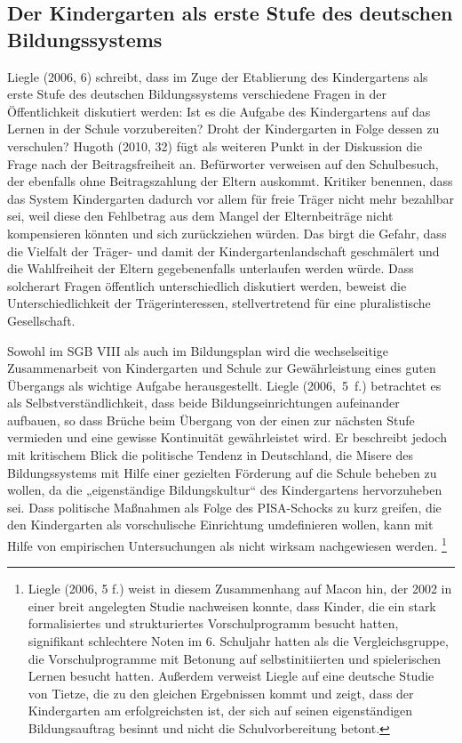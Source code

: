 \subsection{Der Kindergarten als erste Stufe des deutschen Bildungssystems}
Liegle (2006, 6) schreibt, dass im Zuge der Etablierung des Kindergartens als erste Stufe des deutschen Bildungssystems verschiedene Fragen in der Öffentlichkeit diskutiert werden: Ist es die Aufgabe des Kindergartens auf das Lernen in der Schule vorzubereiten? Droht der Kindergarten in Folge dessen zu verschulen? Hugoth (2010, 32) fügt als weiteren Punkt in der Diskussion die Frage nach der Beitragsfreiheit an. Befürworter verweisen auf den Schulbesuch, der ebenfalls ohne Beitragszahlung der Eltern auskommt. Kritiker benennen, dass das System Kindergarten dadurch vor allem für freie Träger nicht mehr bezahlbar sei, weil diese den Fehlbetrag aus dem Mangel der Elternbeiträge nicht kompensieren könnten und sich zurückziehen würden. Das birgt die Gefahr, dass die Vielfalt der Träger- und damit der Kindergartenlandschaft geschmälert und die Wahlfreiheit der Eltern gegebenenfalls unterlaufen werden würde. Dass solcherart Fragen öffentlich unterschiedlich diskutiert werden, beweist die Unterschiedlichkeit der Trägerinteressen, stellvertretend für eine pluralistische Gesellschaft. 

Sowohl im SGB VIII als auch im Bildungsplan wird die wechselseitige Zusammenarbeit von Kindergarten und Schule zur Gewährleistung eines guten Übergangs als wichtige Aufgabe herausgestellt. Liegle (2006,~5~f.) betrachtet es als Selbstverständlichkeit, dass beide Bildungseinrichtungen aufeinander aufbauen, so dass Brüche beim Übergang von der einen zur nächsten Stufe vermieden und eine gewisse Kontinuität gewährleistet wird. Er beschreibt jedoch mit kritischem Blick die politische Tendenz in Deutschland, die Misere des Bildungssystems mit Hilfe einer gezielten Förderung auf die Schule  beheben zu wollen, da die „eigenständige Bildungskultur“ des Kindergartens hervorzuheben sei.
Dass politische Maßnahmen als Folge des PISA-Schocks zu kurz greifen, die den Kindergarten als vorschulische Einrichtung umdefinieren wollen, kann mit Hilfe von empirischen Untersuchungen als nicht wirksam nachgewiesen werden. \footnote{Liegle (2006, 5 f.) weist in diesem Zusammenhang auf Macon hin, der 2002 in einer breit angelegten Studie nachweisen konnte, dass Kinder, die ein stark formalisiertes und strukturiertes Vorschulprogramm besucht hatten, signifikant schlechtere Noten im 6. Schuljahr hatten als die Vergleichsgruppe, die Vorschulprogramme mit Betonung auf selbstinitiierten und spielerischen Lernen besucht hatten. Außerdem verweist Liegle auf eine deutsche Studie von Tietze, die zu den gleichen Ergebnissen kommt und zeigt, dass der Kindergarten am erfolgreichsten ist, der sich auf seinen eigenständigen Bildungsauftrag besinnt und nicht die Schulvorbereitung betont.}

